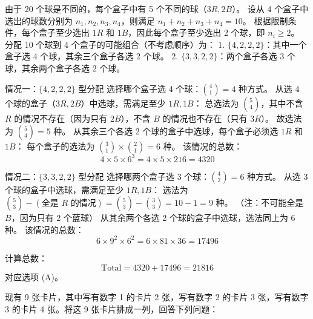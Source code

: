 \begin{questions}
\begin{solution}
由于 20 个球是不同的，每个盒子中有 5 个不同的球（$3R, 2B$）。
设从 4 个盒子中选出的球数分别为 $n_1, n_2, n_3, n_4$，则满足 $n_1 + n_2 + n_3 + n_4 = 10$。
根据限制条件，每个盒子至少选出 $1R$ 和 $1B$，因此每个盒子至少选出 2 个球，即 $n_i \ge 2$。
分配 10 个球到 4 个盒子的可能组合（不考虑顺序）为：
1. $\{4, 2, 2, 2\}$：其中一个盒子选 4 个球，其余三个盒子各选 2 个球。
2. $\{3, 3, 2, 2\}$：两个盒子各选 3 个球，其余两个盒子各选 2 个球。

情况一：$\{4, 2, 2, 2\}$ 型分配
 选择哪个盒子选 4 个球：$\binom{4}{1} = 4$ 种方式。
 从选 4 个球的盒子（$3R, 2B$）中选球，需满足至少 $1R, 1B$：
总选法为 $\binom{5}{4}$，其中不含 $R$ 的情况不存在（因为只有 $2B$），不含 $B$ 的情况也不存在（只有 $3R$）。
故选法为 $\binom{5}{4} = 5$ 种。
 从其余三个各选 2 个球的盒子中选球，每个盒子必须选 $1R$ 和 $1B$：
每个盒子的选法为 $\binom{3}{1} \times \binom{2}{1} = 6$ 种。
 该情况的总数：
\[
4 \times 5 \times 6^3 = 4 \times 5 \times 216 = 4320
\]

情况二：$\{3, 3, 2, 2\}$ 型分配
 选择哪两个盒子选 3 个球：$\binom{4}{2} = 6$ 种方式。
 从选 3 个球的盒子中选球，需满足至少 $1R, 1B$：
选法为 $\binom{5}{3} - (\text{全是 } R \text{ 的情况}) = \binom{5}{3} - \binom{3}{3} = 10 - 1 = 9$ 种。
（注：不可能全是 $B$，因为只有 2 个蓝球）
 从其余两个各选 2 个球的盒子中选球，选法同上为 6 种。
 该情况的总数：
\[
6 \times 9^2 \times 6^2 = 6 \times 81 \times 36 = 17496
\]

计算总数：
\[
\text{Total} = 4320 + 17496 = 21816
\]
对应选项 (A)。
\end{solution}

\question
现有 9 张卡片，其中写有数字 1 的卡片 2 张，写有数字 2 的卡片 3 张，写有数字 3 的卡片 4 张。将这 9 张卡片排成一列，回答下列问题：

\end{questions}
